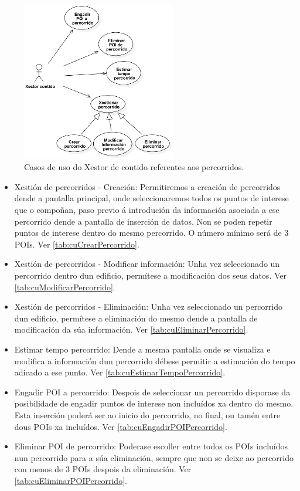 \begin{figure}[tbh]
	\begin{center}
		\includegraphics[width=0.6\textwidth]{figures/CasosUso/XestorContidoPercorrido}
		\caption{Casos de uso do Xestor de contido referentes aos percorridos.}
		\label{fig:cuXestorContidoPercorrido}
	\end{center}
\end{figure}

\begin{itemize}
	\item Xestión de percorridos - Creación: Permitiremos a creación de percorridos dende a pantalla principal, onde seleccionaremos todos os puntos de interese que o compoñan, paso previo á introdución da información asociada a ese percorrido dende a pantalla de inserción de datos. Non se poden repetir puntos de interese dentro do mesmo percorrido. O número mínimo será de 3 POIs. Ver \ref{tab:cuCrearPercorrido}.
	\item Xestión de percorridos - Modificar información: Unha vez seleccionado un percorrido dentro dun edificio, permítese a modificación dos seus datos. Ver \ref{tab:cuModificarPercorrido}.
	\item Xestión de percorridos - Eliminación: Unha vez seleccionado un percorrido dun edificio, permítese a eliminación do mesmo dende a pantalla de modificación da súa información. Ver \ref{tab:cuEliminarPercorrido}.
	\item Estimar tempo percorrido: Dende a mesma pantalla onde se visualiza e modifica a información dun percorrido débese permitir a estimación do tempo adicado a ese punto. Ver \ref{tab:cuEstimarTempoPercorrido}.
	\item Engadir POI a percorrido: Despois de seleccionar un percorrido disporase da posibilidade de engadir puntos de interese non incluídos xa dentro do mesmo. Esta inserción poderá ser ao inicio do percorrido, no final, ou tamén entre dous POIs xa incluídos. Ver \ref{tab:cuEngadirPOIPercorrido}.
	\item Eliminar POI de percorrido: Poderase escoller entre todos os POIs incluídos nun percorrido para a súa eliminación, sempre que non se deixe ao percorrido con menos de 3 POIs despois da eliminación. Ver \ref{tab:cuEliminarPOIPercorrido}.
\end{itemize}


